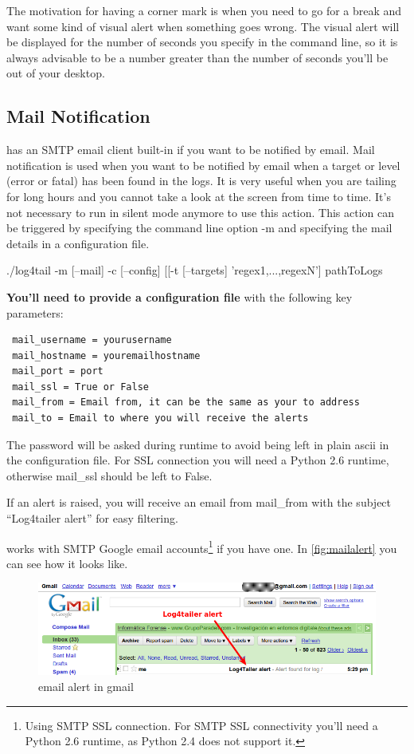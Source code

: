 The motivation for having a corner mark is when you need to go for a break and
want some kind of visual alert when something goes wrong. The visual alert will
be displayed for the number of seconds you specify in the command line, so it
is always advisable to be a number greater than the number of seconds you'll be
out of your desktop. 

\subsection{Mail Notification}
\label{sec:mailnotification}
\logftailer{} has an SMTP email client built-in if you want to be notified by email.
Mail notification is used when you want to be notified by email when a target or level (error or fatal) has been found 
in the logs. It is very useful when you are tailing for long hours and you cannot take 
a look at the screen from time to time. It's not necessary to run in silent mode anymore 
to use this action.
This action can be triggered by specifying the command line option -m and
specifying the mail details in a configuration file. 

\begin{cmd}
 ./log4tail -m [--mail] -c [--config] [[-t [--targets] 'regex1,...,regexN'] pathToLogs
\end{cmd}

\textbf{You'll need to provide a configuration file} with the following key parameters:

\begin{verbatim}
 mail_username = yourusername
 mail_hostname = youremailhostname 
 mail_port = port
 mail_ssl = True or False
 mail_from = Email from, it can be the same as your to address 
 mail_to = Email to where you will receive the alerts
\end{verbatim}
The password will be asked during runtime to avoid being left 
in plain ascii in the configuration file. For SSL connection you will need a Python 2.6 runtime, otherwise 
mail\_ssl should be left to False.

If an alert is raised, you will receive an email from mail\_from with the subject ``Log4tailer 
alert'' for easy filtering.

\logftailer{} works with SMTP Google email accounts\footnote{Using SMTP SSL connection. For SMTP SSL
connectivity you'll need a Python 2.6 runtime, as Python 2.4 does not support it.} if you have one. 
In \autoref{fig:mailalert} you can see how it looks like.

\begin{figure}[hb]
\includegraphics[scale=0.55]{emailalert.png}
\caption{\logftailer{} email alert in gmail}\label{fig:mailalert}
\end{figure}


